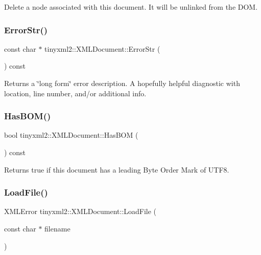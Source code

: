 Delete a node associated with this document. It will be unlinked from the D\+OM. \mbox{\label{classtinyxml2_1_1_x_m_l_document_ae97fff2402a0d01e0509c430b37996b3}} 
\subsubsection{\texorpdfstring{ErrorStr()}{ErrorStr()}}
{\footnotesize\ttfamily const char $\ast$ tinyxml2\+::\+X\+M\+L\+Document\+::\+Error\+Str (\begin{DoxyParamCaption}{ }\end{DoxyParamCaption}) const}

Returns a \char`\"{}long form\char`\"{} error description. A hopefully helpful diagnostic with location, line number, and/or additional info. \mbox{\label{classtinyxml2_1_1_x_m_l_document_a33fc5d159db873a179fa26338adb05bd}} 
\subsubsection{\texorpdfstring{HasBOM()}{HasBOM()}}
{\footnotesize\ttfamily bool tinyxml2\+::\+X\+M\+L\+Document\+::\+Has\+B\+OM (\begin{DoxyParamCaption}{ }\end{DoxyParamCaption}) const\hspace{0.3cm}{\ttfamily [inline]}}

Returns true if this document has a leading Byte Order Mark of U\+T\+F8. \mbox{\label{classtinyxml2_1_1_x_m_l_document_a2ebd4647a8af5fc6831b294ac26a150a}} 
\subsubsection{\texorpdfstring{LoadFile()}{LoadFile()}\hspace{0.1cm}{\footnotesize\ttfamily [1/2]}}
{\footnotesize\ttfamily X\+M\+L\+Error tinyxml2\+::\+X\+M\+L\+Document\+::\+Load\+File (\begin{DoxyParamCaption}\item[{const char $\ast$}]{filename }\end{DoxyParamCaption})}

